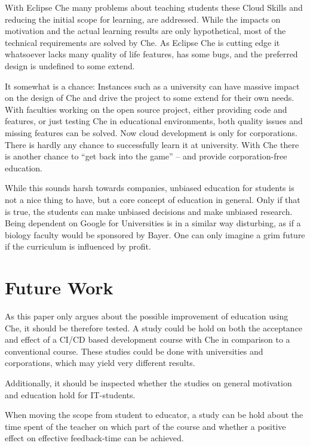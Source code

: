 \documentclass[english,utf8]{lni}
\begin{document}
With Eclipse Che many problems about teaching students these Cloud Skills and reducing the initial scope for learning, are addressed. 
While the impacts on motivation and the actual learning results are only hypothetical, most of the technical requirements are solved by Che.  
As Eclipse Che is cutting edge it whatsoever lacks many quality of life features, has some bugs, and the preferred design is undefined to some extend. 

It somewhat is a chance: 
Instances such as a university can have massive impact on the design of Che and drive the project to some extend for their own needs. 
With faculties working on the open source project, either providing code and features, or just testing Che in educational environments, both quality issues and missing features can be solved.    
Now cloud development is only for corporations. 
There is hardly any chance to successfully learn it at university. 
With Che there is another chance to “get back into the game” – and provide corporation-free education.  

While this sounds harsh towards companies, unbiased education for students is not a nice thing to have, but a core concept of education in general. 
Only if that is true, the students can make unbiased decisions and make unbiased research. 
Being dependent on Google for Universities is in a similar way disturbing, as if a biology faculty would be sponsored by Bayer. 
One can only imagine a grim future if the curriculum is influenced by profit. 
\section*{Future Work}
\label{sec:FutureWork}
As this paper only argues about the possible improvement of education using Che, it should be therefore tested. 
A study could be hold on both the acceptance and effect of a CI/CD based development course with Che in comparison to a conventional course. 
These studies could be done with universities and corporations, which 
may yield very different results.   

Additionally, it should be inspected whether the studies on general motivation and education hold for IT-students. 

When moving the scope from student to educator, a study can be hold about the time spent of the teacher on which part of the course and whether a positive effect on effective feedback-time can be achieved. 


\end{document}
